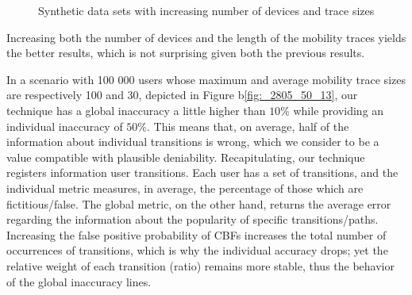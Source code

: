 \begin{figure}[htb]
\hspace*{-0.7em}
\hspace*{-0.7em}
\caption{Synthetic data sets with increasing number of devices and
  trace sizes}
\label{fig:perf_results_sim_devices_traces}
\end{figure}

Increasing both the number of devices and the length of the mobility
traces yields the better results, which is not surprising given both
the previous results.

In a scenario with 100 000 users whose maximum and average mobility
trace sizes are respectively 100 and 30, depicted in Figure
b\ref{fig:_2805_50_13}, our technique has a global inaccuracy a little
higher than $10\%$ while providing an individual inaccuracy of $50\%$.
This means that, on average, half of the information about individual
transitions is wrong, which we consider to be a value compatible with
plausible deniability.  Recapitulating, our technique registers
information user transitions. Each user has a set of transitions, and
the individual metric measures, in average, the percentage of those
which are fictitious/false.  The global metric, on the other hand,
returns the average error regarding the information about the
popularity of specific transitions/paths. Increasing the false
positive probability of CBFs increases the total number of occurrences
of transitions, which is why the individual accuracy drops; yet the
relative weight of each transition (ratio) remains more stable, thus
the behavior of the global inaccuracy lines.

